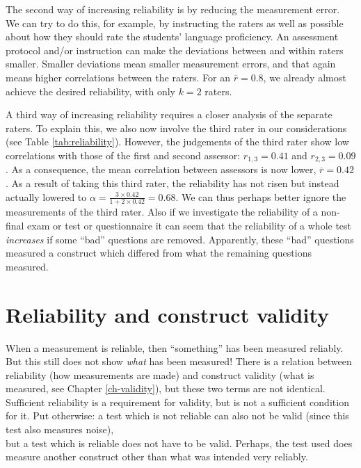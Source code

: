 \documentclass[
]{book}
\begin{document}
The second way of increasing reliability is by reducing the measurement
error. We can try to do this, for example, by instructing the raters as well as
possible
about how they should rate the students' language proficiency. An assessment
protocol and/or
instruction can make the deviations between and within raters smaller.
Smaller deviations mean smaller measurement errors, and that again means
higher correlations between the raters. For an
\(\overline{r}=0.8\), we already almost achieve the desired reliability, with
only \(k=2\) raters.

A third way of increasing reliability requires a closer analysis of
the separate raters. To explain this, we also now involve the third
rater in our considerations (see Table
\ref{tab:reliability}). However, the judgements of the third rater show
low correlations with those of the first and second
assessor: \(r_{1,3}=0.41\) and \(r_{2,3}=0.09\). As a consequence, the mean
correlation between assessors is now lower,
\(\overline{r}=0.42\). As a result of taking this third rater, the reliability
has not risen but instead actually lowered to
\(\alpha = \frac{3\times0.42}{1+2\times0.42} = 0.68\). We can thus
perhaps better ignore the measurements of the third rater.
Also if we investigate the reliability of a non-final exam or test or questionnaire
it can seem that the reliability of a whole test \emph{increases} if some
``bad'' questions are removed. Apparently, these ``bad'' questions measured
a construct which differed from what the remaining questions measured.

\section{Reliability and construct validity}\label{reliability-and-construct-validity}

When a measurement is reliable, then ``something'' has been measured reliably.
But this still does not show \emph{what} has been measured! There is a
relation between reliability (how measurements are made) and construct
validity (what is measured, see
Chapter \ref{ch-validity}), but these two terms are not identical.
Sufficient reliability is a requirement for validity, but
is not a sufficient condition for it. Put otherwise: a test which
is not reliable can also not be valid (since this test also measures noise),\\
but a test which is reliable does not have to be valid.
Perhaps, the test used does measure another construct other than what
was intended very reliably.
\end{document}
